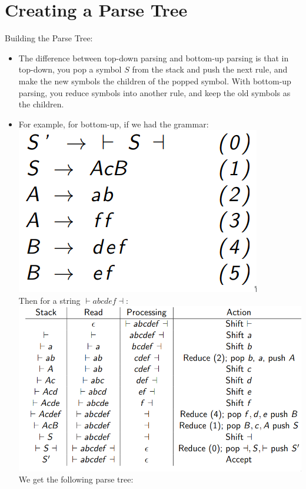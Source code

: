 \documentclass[12pt]{article}
\begin{document}
\section{Creating a Parse Tree}
Building the Parse Tree:
\begin{itemize}
    \item The difference between top-down parsing and bottom-up parsing is that in top-down, you pop a symbol $S$ from the stack and push the next rule, and make the new symbols the children of the popped symbol.  With bottom-up parsing, you reduce symbols into another rule, and keep the old symbols as the children.
    \item For example, for bottom-up, if we had the grammar:\\
        \includegraphics[scale=0.5]{bottom_up_grammar.png}\\
        Then for a string $\vdash abcdef \dashv$:\\
        \includegraphics[scale=0.5]{bottom_up_table.png}\\
        We get the following parse tree:\\

\end{itemize}
\end{document}
